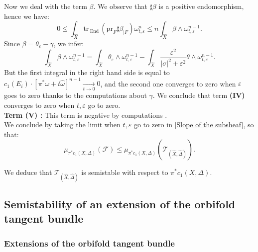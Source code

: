 \documentclass[12pt,a4paper]{amsart}
\newcommand{\End}{\mathrm{End}\,}
\newcommand{\tr}{\mathrm{tr}\,}
\theoremstyle{plain}
\theoremstyle{definition}
\begin{document}
Now we deal with the term $\beta$. We observe that $\sharp \beta$ is a positive endomorphism, hence we have:
$$
0 \leq \int_{\widehat{X}} \tr_\End(\mathrm{pr}_F \sharp \beta_{|F}) \omega_{t, \varepsilon}^n \leq n \int_{\widehat{X}} \beta \wedge \omega_{t, \varepsilon}^{n-1}.
$$
Since $\beta = \theta_\varepsilon - \gamma$, we infer:
$$
\int_{\widehat{X}} \beta \wedge \omega_{t, \varepsilon}^{n-1} = \int_{\widehat{X}} \theta_\varepsilon \wedge \omega_{t, \varepsilon}^{n-1} - \int_{\widehat{X}} \frac{\varepsilon^2}{|\sigma|^2 + \varepsilon^2} \theta \wedge \omega_{t, \varepsilon}^{n-1}.
$$
But the first integral in the right hand side is equal to $c_1(E_i) \cdot \left[ \pi^* \omega + t \widehat{\omega} \right]^{n-1} \underset{t \longrightarrow 0}{\longrightarrow} 0$, and the second one converges to zero when $\varepsilon$ goes to zero thanks to the computations about $\gamma$.
We conclude that term \textbf{(IV)} converges to zero when $t, \varepsilon$ go to zero.\\

\textbf{Term (V) :} This term is negative by computations \cite[Proof of 5.8.2]{Kob87}.\\

We conclude by taking the limit when $t, \varepsilon$ go to zero in \ref{Slope of the subsheaf}, so that:
$$
\mu_{\pi^*c_1(X, \Delta)}(\mathcal{F}) \leq \mu_{\pi^*c_1(X, \Delta)}(\mathcal{T}_{(\widehat{X}, \widehat{\Delta})}).
$$

We deduce that $\mathcal{T}_{(\widehat{X}, \widehat{\Delta})}$ is semistable with respect to $\pi^*c_1(X, \Delta)$.




\subsection{Semistability of an extension of the orbifold tangent bundle}

\subsubsection{Extensions of the orbifold tangent bundle}
\end{document}
